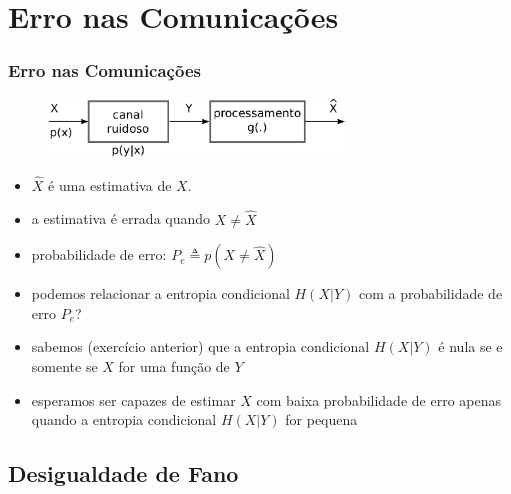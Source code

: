 \section{Erro nas Comunicações}

\begin{frame}[allowframebreaks]
  \frametitle{Erro nas Comunicações}

  \begin{figure}[h!]
  \centering
  \includegraphics[width=0.7\textwidth]{images/canal-ruidoso.pdf}
  \label{fig:canal-ruidoso}
  \end{figure}

  \begin{itemize}
        \item $\hat{X}$ é uma estimativa de $X$.
        \item a estimativa é errada quando $X \neq \hat{X}$
        \item probabilidade de erro: $P_e \triangleq p(X \neq \hat{X})$
        \item podemos relacionar a entropia condicional $H(X|Y)$ com a probabilidade de erro $P_e$?
        \item sabemos (exercício anterior) que a entropia condicional $H(X|Y)$ é nula se e somente
        se $X$ for uma função de $Y$
        \item esperamos ser capazes de estimar $X$ com baixa probabilidade de erro apenas quando
        a entropia condicional $H(X|Y)$ for pequena
  \end{itemize}
\end{frame}

\subsection{Desigualdade de Fano}

